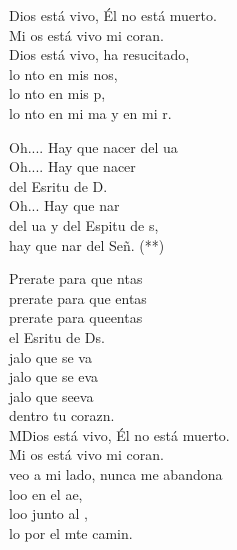 \begin{cancion}%
	 Dios está vivo, Él no está muerto.\\
	Mi os está vivo mi coran.\\
	 Dios está vivo, ha resucitado,\\
	lo nto en mis nos,\\
	lo nto en mis p,\\
	lo nto en mi ma y en mi r.\jump\\
	\begin{chorus}%
		Oh.... Hay que nacer del ua\\
		Oh.... Hay que nacer\\
		del Esritu de D.\\
		Oh... Hay que nar\\
		del ua y del Espitu de s,\\
		hay que nar del Señ. (**)\jump\\
	\end{chorus}%
	Prerate para que ntas\\
	prerate para que entas\\
	prerate para queentas\\
	el Esritu de Ds.\\
	\jump
	jalo que se va\\
	jalo que se eva\\
	jalo que seeva\\
	dentro  tu corazn.\\
	\jump
	MDios está vivo, Él no está muerto.\\
	Mi os está vivo mi coran.\\
	 veo a mi lado, nunca me abandona\\
	loo en el ae,\\
	loo junto al ,\\
	lo  por el mte camin.\\
\end{cancion}%

